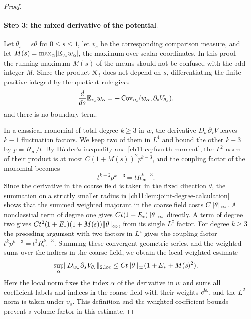 \begin{proof}
\paragraph{Step 3: the mixed derivative of the potential.}
Let $\theta_s=s\theta$ for $0\le s\le1$, let $\upsilon_s$ be the corresponding comparison measure, and let $M(s)=\max_\alpha\lvert \mathbb E_{\upsilon_s}w_\alpha\rvert$, the maximum over scalar coordinates. In this proof, the running maximum $M(s)$ of the means should not be confused with the odd integer $M$. Since the product $\mathcal K_t$ does not depend on $s$, differentiating the finite positive integral by the quotient rule gives
\begin{equation}\label{ch11:eq:ambient-score}
 \frac d{ds}\mathbb E_{\upsilon_s}w_\alpha=-\operatorname{Cov}_{\upsilon_s}(w_\alpha,\partial_sV_{\theta_s}),
\end{equation}
and there is no boundary term.

In a classical monomial of total degree $k\ge3$ in $w$, the derivative $D_w\partial_sV$ leaves $k-1$ fluctuation factors. We keep two of them in $L^4$ and bound the other $k-3$ by $p=R_{\mathrm{en}}/t$. By H\"older's inequality and \eqref{ch11:eq:fourth-moment}, the $L^2$ norm of their product is at most $C(1+M(s))^2p^{k-3}$, and the coupling factor of the monomial becomes
\[
 t^{k-2}p^{k-3}=tR_{\mathrm{en}}^{k-3}.
\]
Since the derivative in the coarse field is taken in the fixed direction $\theta$, the summation on a strictly smaller radius in \cref{ch11:lem:joint-degree-calculation} shows that the summed weighted majorant in the coarse field costs $C\lVert \theta\rVert_\infty$. A nonclassical term of degree one gives $Ct(1+E_*)\lVert \theta\rVert_\infty$ directly. A term of degree two gives $Ct^2(1+E_*)(1+M(s))\lVert \theta\rVert_\infty$, from its single $L^2$ factor. For degree $k\ge3$ the preceding argument with two factors in $L^4$ gives the coupling factor $t^kp^{k-3}=t^3R_{\mathrm{en}}^{k-3}$. Summing these convergent geometric series, and the weighted sums over the indices in the coarse field, we obtain the local weighted estimate
\begin{equation}\label{ch11:eq:ambient-mixed-score}
 \sup_\alpha\lVert D_{w_\alpha}\partial_sV_{\theta_s}\rVert_{2,\mathrm{loc}}\le Ct\lVert \theta\rVert_\infty(1+E_*+M(s)^2).
\end{equation}
Here the local norm fixes the index $\alpha$ of the derivative in $w$ and sums all coefficient labels and indices in the coarse field with their weights $e^{b\mathsf t}$, and the $L^2$ norm is taken under $\upsilon_s$. This definition and the weighted coefficient bounds prevent a volume factor in this estimate.


\end{proof}
